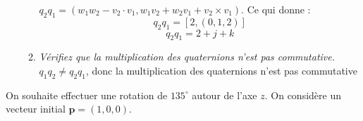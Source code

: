 \documentclass[a4paper,12pt]{article}
\begin{document}
\begin{enumerate}
\begin{enumerate}
              \( q_2 q_1 = (w_1 w_2 − v_2 \cdot v_1, w_1 v_2 + w_2 v_1 + v_2 \times v_1) \). \newline
              Ce qui donne :
              \begin{equation}
              q_2 q_1 = [2, (0, 1, 2)]
              \end{equation}
              \begin{equation}
              \boxed{q_2 q_1 = 2 + j + k}
              \end{equation}
              \item \emph{Vérifiez que la multiplication des quaternions n’est pas commutative.} \newline \newline
              \(q_1 q_2 \neq q_2 q_1\), donc la multiplication des quaternions n'est pas commutative
          \end{enumerate}
\end{enumerate}



On souhaite effectuer une rotation de $135^\circ$ autour de l’axe $z$. On considère un vecteur initial $\mathbf{p} = (1, 0, 0)$.
\end{document}
